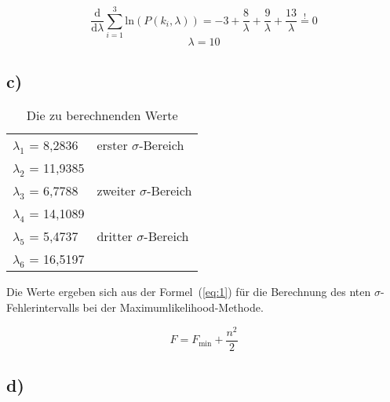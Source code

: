 \begin{equation*}
\frac{\mathrm{d}}{\mathrm{d}\lambda}\sum_{i=1}^3 \mathrm{ln}(P(k_i,\lambda)) = -3+\frac{8}{\lambda}+\frac{9}{\lambda}+\frac{13}{\lambda} \stackrel{!}{=} 0
\end{equation*}
\begin{equation*}
\lambda = 10
\end{equation*}

\subsection*{c)}
\begin{table}[H]
\centering
\begin{tabular}{ll}
$\lambda_1$ = 8,2836 & erster $\sigma$-Bereich\\
$\lambda_2$ = 11,9385 &\\
$\lambda_3$ = 6,7788 & zweiter $\sigma$-Bereich\\
$\lambda_4$ = 14,1089& \\
$\lambda_5$ = 5,4737 & dritter $\sigma$-Bereich\\
$\lambda_6$ = 16,5197&
\end{tabular}
\caption{Die zu berechnenden Werte}
\end{table}

\noindent
Die Werte ergeben sich aus der Formel~(\ref{eq:1}) für die Berechnung des nten $\sigma$-Fehlerintervalls bei der Maximumlikelihood-Methode.

\begin{equation}
F = F_\text{min}+\frac{n^2}{2}
\label{eq:1}
\end{equation}

\subsection*{d)}

